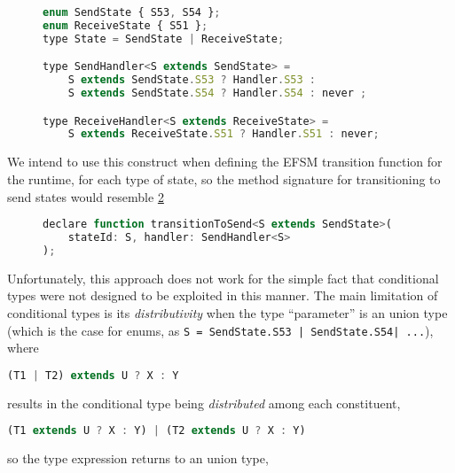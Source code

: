 \begin{figure}[!h]
\begin{lstlisting}[language=javascript,tabsize=2]
enum SendState { S53, S54 };
enum ReceiveState { S51 };
type State = SendState | ReceiveState;

type SendHandler<S extends SendState> = 
	S extends SendState.S53 ? Handler.S53 :
	S extends SendState.S54 ? Handler.S54 : never ;

type ReceiveHandler<S extends ReceiveState> = 
	S extends ReceiveState.S51 ? Handler.S51 : never;
\end{lstlisting}
\label{lst:conditionaltypes}
\end{figure}

We intend to use this construct when defining the EFSM transition
function for the runtime, for each type of state,
so the method signature for transitioning to send states
would resemble \cref{lst:conditionaltransitionfunction}

\begin{figure}[!h]
\begin{lstlisting}[language=javascript,numbers=none]
declare function transitionToSend<S extends SendState>(
	stateId: S, handler: SendHandler<S>
);
\end{lstlisting}
\label{lst:conditionaltransitionfunction}
\end{figure}

Unfortunately, this approach does not work for the simple fact that
conditional types were not designed to be exploited in this manner.
The main limitation of conditional types is its 
\textit{distributivity} when the type ``parameter'' is an
union type (which is the case for enums, as
\texttt{S = SendState.S53 | SendState.S54| ...}), where

\begin{lstlisting}[language=javascript,numbers=none]
(T1 | T2) extends U ? X : Y
\end{lstlisting}

results in the conditional type being \textit{distributed}
among each constituent,

\begin{lstlisting}[language=javascript,numbers=none]
(T1 extends U ? X : Y) | (T2 extends U ? X : Y)
\end{lstlisting}

so the type expression returns to an union type,

